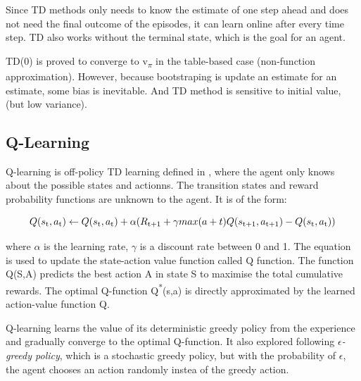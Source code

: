 \documentclass[12pt,twoside]{report}
\begin{document}
Since TD methods only needs to know the estimate of one step ahead and does not need the final outcome of the episodes, it can learn online after every time step. TD also works without the terminal state, which is the goal for an agent.

TD(0) is proved to converge to v\textsubscript{$\pi$} in the table-based case (non-function approximation). 
However, because bootstraping is update an estimate for an estimate, some bias is inevitable. And TD method is sensitive to initial value, (but low variance). 

\subsection{Q-Learning}

Q-learning is off-policy TD learning defined in \cite{Watkins}, where the agent only knows about the possible states and actionns. The transition states and reward probability functions are unknown to the agent.
It is of the form:

\begin{equation}
Q(s\textsubscript{t},a\textsubscript{t}) \leftarrow Q(s\textsubscript{t},a\textsubscript{t}) +  \alpha(R\textsubscript{t+1} + \gamma  max (a+t) Q(s\textsubscript{t+1}, a\textsubscript{t+1}) - Q(s\textsubscript{t}, a\textsubscript{t}))
\end{equation}

where $\alpha$ is the learning rate, $\gamma$ is a discount rate between 0 and 1. The equation is used to update the state-action value function called Q function. The function Q(S,A) predicts the best action A in state S to maximise the total cumulative rewards.
The optimal Q-function Q\textsuperscript{*}(s,a) is directly approximated by the learned action-value function Q. 

Q-learning learns the value of its deterministic greedy policy from the experience and gradually converge to the optimal Q-function. It also explored following \textit{$\epsilon$-greedy policy}, which is a stochastic greedy policy, but with the probability of $\epsilon$, the agent chooses an action randomly instea of the greedy action. 
\end{document}
